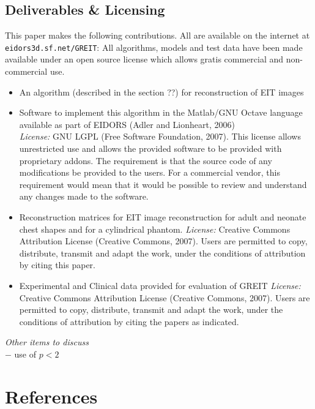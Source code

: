 \documentclass[12pt]{iopart}
\begin{document}
\subsection{Deliverables \& Licensing}

This paper makes the following contributions. All are
available on the internet at \verb+eidors3d.sf.net/GREIT+:
All algorithms, models and test data have been made available
under an open source license which allows
gratis commercial and non-commercial use.
\begin{itemize}
\item An algorithm (described in the section ??) for reconstruction
         of EIT images
\item Software to implement this algorithm in the Matlab/GNU Octave
         language available as part of EIDORS (Adler and Lionheart, 2006)
\\
{\em License:}
    GNU LGPL (Free Software Foundation, 2007).
   This license allows
   unrestricted use and allows the provided software to
   be provided with proprietary addons. The requirement is
   that the source code of any modifications be provided to
   the users. For a commercial vendor, this requirement would
   mean that it would be possible to review and understand any
   changes made to the software.

\item Reconstruction matrices for EIT image reconstruction for
      adult and neonate chest shapes and for a cylindrical phantom.
{\em License:} Creative Commons Attribution
   License (Creative Commons, 2007). Users are permitted
   to copy, distribute, transmit and adapt the work,
   under the conditions of attribution by citing this paper.

\item Experimental and Clinical data provided for evaluation of GREIT
{\em License:} Creative Commons Attribution
   License (Creative Commons, 2007). Users are permitted
   to copy, distribute, transmit and adapt the work,
   under the conditions of attribution by citing the
   papers as indicated.
\end{itemize}

{\em Other items to discuss}
\\
$-$ use of $p<2$



\section*{References}
\end{document}
